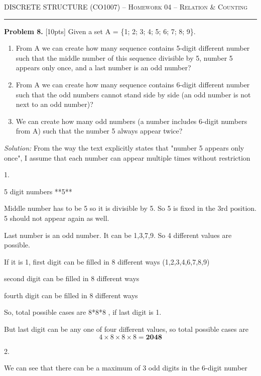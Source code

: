 \documentclass[12pt]{amsart}
\begin{document}
{\scshape } \hfill {\scshape DISCRETE STRUCTURE (CO1007) -- Homework 04 -- Relation \& Counting} \hfill {\scshape }
 
\smallskip

\hrule

\bigskip

\bigskip 

\textbf{Problem 8. }[10pts] Given a set A = \{1; 2; 3; 4; 5; 6; 7; 8; 9\}.
\begin{enumerate}
    \item From A we can create how many sequence contains 5-digit different number such that the middle
number of this sequence divisible by 5, number 5 appears only once, and a last number is an odd
number?
\item From A we can create how many sequence contains 6-digit different number such that the odd numbers
cannot stand side by side (an odd number is not next to an odd number)?
\item We can create how many odd numbers (a number includes 6-digit numbers from A) such that the
number 5 always appear twice?
\end{enumerate}
\bigskip

\textit{Solution:}
From the way the text explicitly states that "number 5 appears only once", I assume that each number can appear multiple times without restriction

1.

5 digit numbers      **5**

Middle number has to be 5 so it is divisible by 5. So 5 is fixed in the 3rd position. 5 should not appear again as well.

Last number is an odd number. It can be 1,3,7,9. So 4 different values are possible.

If it is 1, first digit can be filled in 8 different ways (1,2,3,4,6,7,8,9)

               second digit can be filled in 8 different ways

               fourth digit can be filled in 8 different ways

So, total possible cases are 8*8*8 , if last digit is 1.

But last digit can be any one of four different values, so total possible cases are \[4\times8\times8\times8 = \mathbf{2048}\]

2. 

We can see that there can be a maximum of 3 odd digits in the 6-digit number
\end{document}
